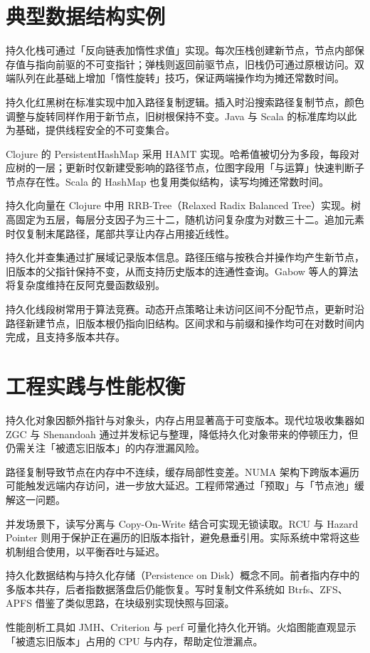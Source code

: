 \chapter{典型数据结构实例}
持久化栈可通过「反向链表加惰性求值」实现。每次压栈创建新节点，节点内部保存值与指向前驱的不可变指针；弹栈则返回前驱节点，旧栈仍可通过原根访问。双端队列在此基础上增加「惰性旋转」技巧，保证两端操作均为摊还常数时间。\par
持久化红黑树在标准实现中加入路径复制逻辑。插入时沿搜索路径复制节点，颜色调整与旋转同样作用于新节点，旧树根保持不变。Java 与 Scala 的标准库均以此为基础，提供线程安全的不可变集合。\par
Clojure 的 PersistentHashMap 采用 HAMT 实现。哈希值被切分为多段，每段对应树的一层；更新时仅新建受影响的路径节点，位图字段用「与运算」快速判断子节点存在性。Scala 的 HashMap 也复用类似结构，读写均摊还常数时间。\par
持久化向量在 Clojure 中用 RRB-Tree（Relaxed Radix Balanced Tree）实现。树高固定为五层，每层分支因子为三十二，随机访问复杂度为对数三十二。追加元素时仅复制末尾路径，尾部共享让内存占用接近线性。\par
持久化并查集通过扩展域记录版本信息。路径压缩与按秩合并操作均产生新节点，旧版本的父指针保持不变，从而支持历史版本的连通性查询。Gabow 等人的算法将复杂度维持在反阿克曼函数级别。\par
持久化线段树常用于算法竞赛。动态开点策略让未访问区间不分配节点，更新时沿路径新建节点，旧版本根仍指向旧结构。区间求和与前缀和操作均可在对数时间内完成，且支持多版本共存。\par
\chapter{工程实践与性能权衡}
持久化对象因额外指针与对象头，内存占用显著高于可变版本。现代垃圾收集器如 ZGC 与 Shenandoah 通过并发标记与整理，降低持久化对象带来的停顿压力，但仍需关注「被遗忘旧版本」的内存泄漏风险。\par
路径复制导致节点在内存中不连续，缓存局部性变差。NUMA 架构下跨版本遍历可能触发远端内存访问，进一步放大延迟。工程师常通过「预取」与「节点池」缓解这一问题。\par
并发场景下，读写分离与 Copy-On-Write 结合可实现无锁读取。RCU 与 Hazard Pointer 则用于保护正在遍历的旧版本指针，避免悬垂引用。实际系统中常将这些机制组合使用，以平衡吞吐与延迟。\par
持久化数据结构与持久化存储（Persistence on Disk）概念不同。前者指内存中的多版本共存，后者指数据落盘后仍能恢复。写时复制文件系统如 Btrfs、ZFS、APFS 借鉴了类似思路，在块级别实现快照与回滚。\par
性能剖析工具如 JMH、Criterion 与 perf 可量化持久化开销。火焰图能直观显示「被遗忘旧版本」占用的 CPU 与内存，帮助定位泄漏点。\par
